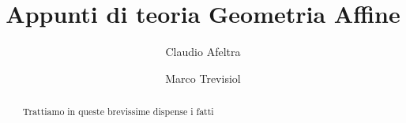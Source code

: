 \documentclass[a4paper,12pt]{article}
\title{Appunti di teoria Geometria Affine}
\author{Claudio Afeltra \and Marco Trevisiol}
\begin{document}
\maketitle


\begin{abstract}
	Trattiamo in queste brevissime dispense i fatti 	
\end{abstract}
\clearpage
\end{document}
